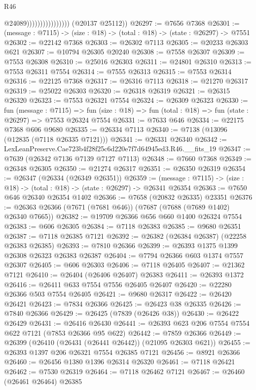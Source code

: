 \begin{lexlean}{R46}
\begin{coremodule}
                                      @24089))))))))))))))))
      (@20137 @25112))
@26297 := @7656 @7368
@26301 := (message : @7115) -> (size : @18) -> (total : @18) -> (state : @26297) -> @7551
@26302 := @22142 @7368
@26303 := @26302 @7113
@26305 := @20233 @26303 @621
@26307 := @10794 @26305 @20240
@26308 := @7558 @26307
@26309 := @7553 @26308
@26310 := @25016 @26303
@26311 := @24801 @26310
@26313 := @7553 @26311 @7554
@26314 := @7555 @26313
@26315 := @7553 @26314
@26316 := @22125 @7368
@26317 := @26316 @7113
@26318 := @21270 @26317
@26319 := @25022 @26303
@26320 := @26318 @26319
@26321 := @26315 @26320
@26323 := @7553 @26321 @7554
@26324 := @26309 @26323
@26330 := fun (message : @7115) =>
  fun (size : @18) => fun (total : @18) => fun (state : @26297) => @7553 @26324 @7554
@26331 := @7633 @646
@26334 := @22175 @7368 @606 @9680
@26335 := @26334 @7113
@26340 := @7138 (@13096 (@12835 (@7118 @26335 @7121)))
@26341 := @26331 @26340
@26342 := LexLeanPreserve.Cae723b4f28f25c6d220e7f7d64945ed3.R46.__fits_19
@26347 := @7639 (@26342 @7136 @7139 @7127 @7113)
@26348 := @7660 @7368
@26349 := @26348 @26305
@26350 := @21274 @26317
@26351 := @26350 @26319
@26354 := @26347 (@26334 (@26349 @26351))
@26359 := (message : @7115) -> (size : @18) -> (total : @18) -> (state : @26297) -> @26341 @26354
@26363 := @7650 @646 @26340 @26354 @1402
@26366 := @7658 (@20832 @26335) @23351
@26376 := @26363 @26366 (@7671 (@7681 @646)) (@7687 (@7688 (@7689 @1402) @26340 @7665))
@26382 := @19709 @26366 @656 @660 @1400 @26324 @7554
@26383 := @606 @26305
@26384 := @7118 @26383
@26385 := @9680 @26351
@26387 := @7118 @26385 @7121
@26392 := @26382 (@26384 @26387) (@22258 @26383 @26385)
@26393 := @7810 @26366
@26399 := @26393 @1375 @1399 @26308 @26323 @26383 @26387
@26404 := @7794 @26366 @603 @1374 @7557 @26307
@26405 := @606 @26303
@26406 := @7118 @26405
@26407 := @21362 @7121
@26410 := @26404 (@26406 @26407) @26383
@26411 := @26393 @1372
@26416 := @26411 @633 @7554 @7556 @26405 @26407
@26420 := @22280 @26366 @503 @7554 @26405
@26421 := @9680 @26317
@26422 := @26420 @26421
@26423 := @7834 @26366
@26425 := @26423 @38 @26335
@26426 := @7840 @26366
@26429 := @26425 (@7839 (@26426 @38))
@26430 := @26422 @26429
@26431 := @26416 @26430
@26441 := @26393 @623 @206 @7554 @7554 @622 @7121 (@7853 @26366 @95 @622)
@26442 := @7859 @26366
@26449 := @26399 (@26410 (@26431 (@26441 @26442)) (@21095 @26303 @621))
@26455 := @26393 @1397 @206 @26321 @7554 @26385 @7121
@26456 := @8921 @26366
@26460 := @26456 @1380 @1396 @26314 @26320
@26461 := @7118 @26421
@26462 := @7530 @26319
@26464 := @7118 @26462 @7121
@26467 := @26460 (@26461 @26464) @26385

\end{coremodule}
\end{lexlean}
